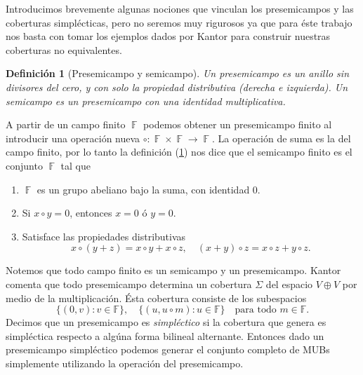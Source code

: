 \documentclass[a4paper]{report}
\DeclareMathOperator{\F}{\mathbb{F}}
\newtheorem{definition}{Definición}
\begin{document}
  Introducimos brevemente algunas nociones que vinculan los
  presemicampos y las coberturas simplécticas, pero no
  seremos muy rigurosos ya que para éste trabajo nos basta
  con tomar los ejemplos dados por Kantor \cite{kantor2012}
  para construir nuestras coberturas no equivalentes.
  \begin{definition}[Presemicampo y semicampo]
    \label{def:presemifield}
    Un presemicampo es un anillo sin divisores del cero, y
    con solo la propiedad distributiva (derecha e
    izquierda). Un semicampo es un presemicampo con una
    identidad multiplicativa.
  \end{definition}
  A partir de un campo finito $\F$ podemos obtener un
  presemicampo finito al introducir una operación nueva
  $\circ : \F \times \F \to \F$. La operación de suma es la
  del campo finito, por lo tanto la definición
  (\ref{def:presemifield}) nos dice que el semicampo finito
  es el conjunto $\F$ tal que
  \begin{enumerate}
    \item $\F$ es un grupo abeliano bajo la suma, con
      identidad $0$.
    \item Si $x \circ y = 0$, entonces $x = 0$ ó $y = 0$.
    \item Satisface las propiedades distributivas
      \[
        x \circ (y + z) = x \circ y + x \circ z,
        \quad
        (x + y) \circ z = x \circ z + y \circ z.
      \] 
  \end{enumerate}
  Notemos que todo campo finito es un semicampo y un
  presemicampo. Kantor comenta que todo presemicampo
  determina un cobertura $\Sigma$ del espacio $V \oplus V$
  por medio de la multiplicación. Ésta cobertura consiste de
  los subespacios
  \begin{equation}
    \label{eqn:presemi_spread}
    \{(0,v) : v \in \mathbb F\},
    \quad 
    \{(u, u \circ m) : u \in \mathbb F\}
    \quad
    \text{para todo } m \in \mathbb F.
  \end{equation}
  Decimos que un presemicampo es \textit{simpléctico} si la
  cobertura que genera es simpléctica respecto a
  algúna forma bilineal alternante. Entonces dado un
  presemicampo simpléctico podemos generar el conjunto
  completo de MUBs simplemente utilizando la operación del
  presemicampo.
\end{document}
